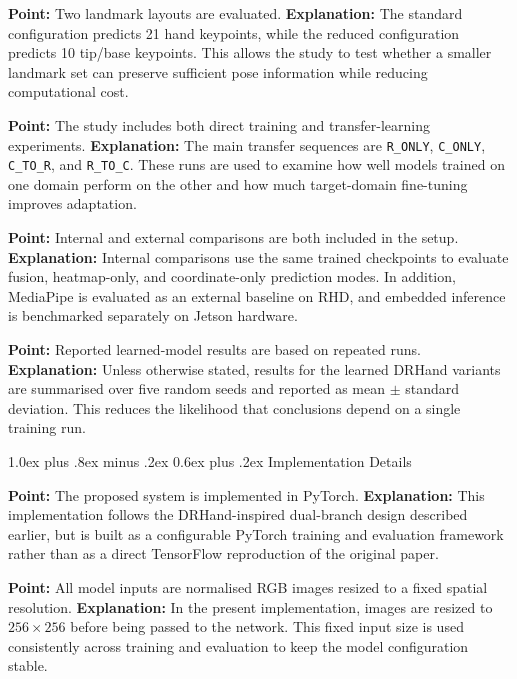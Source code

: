 \documentclass[10pt,letterpaper]{article}
\makeatletter
\renewcommand\subsection{\@startsection{subsection}{2}{\z@}%
  {1.0ex plus .8ex minus .2ex}%
  {0.6ex plus .2ex}%
  {\normalfont\itshape}}
\makeatother
\begin{document}
\medskip
\noindent\textbf{Point:} Two landmark layouts are evaluated.  
\textbf{Explanation:} The standard configuration predicts 21 hand keypoints, while the reduced configuration predicts 10 tip/base keypoints. This allows the study to test whether a smaller landmark set can preserve sufficient pose information while reducing computational cost.

\medskip
\noindent\textbf{Point:} The study includes both direct training and transfer-learning experiments.  
\textbf{Explanation:} The main transfer sequences are \texttt{R\_ONLY}, \texttt{C\_ONLY}, \texttt{C\_TO\_R}, and \texttt{R\_TO\_C}. These runs are used to examine how well models trained on one domain perform on the other and how much target-domain fine-tuning improves adaptation.

\medskip
\noindent\textbf{Point:} Internal and external comparisons are both included in the setup.  
\textbf{Explanation:} Internal comparisons use the same trained checkpoints to evaluate fusion, heatmap-only, and coordinate-only prediction modes. In addition, MediaPipe is evaluated as an external baseline on RHD, and embedded inference is benchmarked separately on Jetson hardware.

\medskip
\noindent\textbf{Point:} Reported learned-model results are based on repeated runs.  
\textbf{Explanation:} Unless otherwise stated, results for the learned DRHand variants are summarised over five random seeds and reported as mean $\pm$ standard deviation. This reduces the likelihood that conclusions depend on a single training run.

\subsection{Implementation Details}

\noindent\textbf{Point:} The proposed system is implemented in PyTorch.  
\textbf{Explanation:} This implementation follows the DRHand-inspired dual-branch design described earlier, but is built as a configurable PyTorch training and evaluation framework rather than as a direct TensorFlow reproduction of the original paper.

\medskip
\noindent\textbf{Point:} All model inputs are normalised RGB images resized to a fixed spatial resolution.  
\textbf{Explanation:} In the present implementation, images are resized to $256 \times 256$ before being passed to the network. This fixed input size is used consistently across training and evaluation to keep the model configuration stable.
\end{document}
